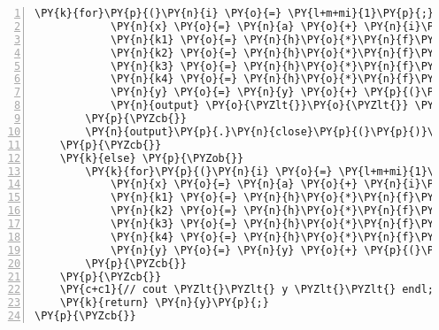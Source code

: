\begin{Verbatim}[tabsize=2,commandchars=\\\{\},numbers=left,firstnumber=1,stepnumber=1]
		\PY{k}{for}\PY{p}{(}\PY{n}{i} \PY{o}{=} \PY{l+m+mi}{1}\PY{p}{;} \PY{n}{i} \PY{o}{\PYZlt{}} \PY{n}{steps}\PY{o}{+}\PY{l+m+mi}{1}\PY{p}{;} \PY{n}{i}\PY{o}{+}\PY{o}{+}\PY{p}{)}\PY{p}{\PYZob{}}
			\PY{n}{x} \PY{o}{=} \PY{n}{a} \PY{o}{+} \PY{n}{i}\PY{o}{*}\PY{n}{h}\PY{p}{;}
			\PY{n}{k1} \PY{o}{=} \PY{n}{h}\PY{o}{*}\PY{n}{f}\PY{p}{(}\PY{n}{x}\PY{p}{,}\PY{n}{y}\PY{p}{)}\PY{p}{;}
			\PY{n}{k2} \PY{o}{=} \PY{n}{h}\PY{o}{*}\PY{n}{f}\PY{p}{(}\PY{n}{x} \PY{o}{+} \PY{l+m+mf}{0.5}\PY{o}{*}\PY{n}{h}\PY{p}{,} \PY{n}{y} \PY{o}{+} \PY{l+m+mf}{0.5}\PY{o}{*}\PY{n}{k1}\PY{p}{)}\PY{p}{;}
			\PY{n}{k3} \PY{o}{=} \PY{n}{h}\PY{o}{*}\PY{n}{f}\PY{p}{(}\PY{n}{x} \PY{o}{+} \PY{l+m+mf}{0.5}\PY{o}{*}\PY{n}{h}\PY{p}{,} \PY{n}{y} \PY{o}{+} \PY{l+m+mf}{0.5}\PY{o}{*}\PY{n}{k2}\PY{p}{)}\PY{p}{;}
			\PY{n}{k4} \PY{o}{=} \PY{n}{h}\PY{o}{*}\PY{n}{f}\PY{p}{(}\PY{n}{x} \PY{o}{+} \PY{n}{h}\PY{p}{,} \PY{n}{y} \PY{o}{+} \PY{n}{k3}\PY{p}{)}\PY{p}{;}
			\PY{n}{y} \PY{o}{=} \PY{n}{y} \PY{o}{+} \PY{p}{(}\PY{l+m+mf}{1.}\PY{o}{/}\PY{l+m+mf}{6.}\PY{p}{)}\PY{o}{*}\PY{p}{(}\PY{n}{k1} \PY{o}{+} \PY{l+m+mi}{2}\PY{o}{*}\PY{n}{k2} \PY{o}{+} \PY{l+m+mi}{2}\PY{o}{*}\PY{n}{k3} \PY{o}{+} \PY{n}{k4}\PY{p}{)}\PY{p}{;}
			\PY{n}{output} \PY{o}{\PYZlt{}}\PY{o}{\PYZlt{}} \PY{n}{x} \PY{o}{\PYZlt{}}\PY{o}{\PYZlt{}} \PY{l+s}{\PYZdq{}}\PY{l+s}{,}\PY{l+s}{\PYZdq{}} \PY{o}{\PYZlt{}}\PY{o}{\PYZlt{}} \PY{n}{y}\PY{p}{[}\PY{l+m+mi}{0}\PY{p}{]} \PY{o}{\PYZlt{}}\PY{o}{\PYZlt{}} \PY{n}{endl}\PY{p}{;}
		\PY{p}{\PYZcb{}}
		\PY{n}{output}\PY{p}{.}\PY{n}{close}\PY{p}{(}\PY{p}{)}\PY{p}{;}
	\PY{p}{\PYZcb{}}
	\PY{k}{else} \PY{p}{\PYZob{}}
		\PY{k}{for}\PY{p}{(}\PY{n}{i} \PY{o}{=} \PY{l+m+mi}{1}\PY{p}{;} \PY{n}{i} \PY{o}{\PYZlt{}} \PY{n}{steps}\PY{o}{+}\PY{l+m+mi}{1}\PY{p}{;} \PY{n}{i}\PY{o}{+}\PY{o}{+}\PY{p}{)}\PY{p}{\PYZob{}}
			\PY{n}{x} \PY{o}{=} \PY{n}{a} \PY{o}{+} \PY{n}{i}\PY{o}{*}\PY{n}{h}\PY{p}{;}
			\PY{n}{k1} \PY{o}{=} \PY{n}{h}\PY{o}{*}\PY{n}{f}\PY{p}{(}\PY{n}{x}\PY{p}{,}\PY{n}{y}\PY{p}{)}\PY{p}{;}
			\PY{n}{k2} \PY{o}{=} \PY{n}{h}\PY{o}{*}\PY{n}{f}\PY{p}{(}\PY{n}{x} \PY{o}{+} \PY{l+m+mf}{0.5}\PY{o}{*}\PY{n}{h}\PY{p}{,} \PY{n}{y} \PY{o}{+} \PY{l+m+mf}{0.5}\PY{o}{*}\PY{n}{k1}\PY{p}{)}\PY{p}{;}
			\PY{n}{k3} \PY{o}{=} \PY{n}{h}\PY{o}{*}\PY{n}{f}\PY{p}{(}\PY{n}{x} \PY{o}{+} \PY{l+m+mf}{0.5}\PY{o}{*}\PY{n}{h}\PY{p}{,} \PY{n}{y} \PY{o}{+} \PY{l+m+mf}{0.5}\PY{o}{*}\PY{n}{k2}\PY{p}{)}\PY{p}{;}
			\PY{n}{k4} \PY{o}{=} \PY{n}{h}\PY{o}{*}\PY{n}{f}\PY{p}{(}\PY{n}{x} \PY{o}{+} \PY{n}{h}\PY{p}{,} \PY{n}{y} \PY{o}{+} \PY{n}{k3}\PY{p}{)}\PY{p}{;}
			\PY{n}{y} \PY{o}{=} \PY{n}{y} \PY{o}{+} \PY{p}{(}\PY{l+m+mf}{1.}\PY{o}{/}\PY{l+m+mf}{6.}\PY{p}{)}\PY{o}{*}\PY{p}{(}\PY{n}{k1} \PY{o}{+} \PY{l+m+mi}{2}\PY{o}{*}\PY{n}{k2} \PY{o}{+} \PY{l+m+mi}{2}\PY{o}{*}\PY{n}{k3} \PY{o}{+} \PY{n}{k4}\PY{p}{)}\PY{p}{;}
		\PY{p}{\PYZcb{}}
	\PY{p}{\PYZcb{}}
	\PY{c+c1}{// cout \PYZlt{}\PYZlt{} y \PYZlt{}\PYZlt{} endl; // option print statement}
	\PY{k}{return} \PY{n}{y}\PY{p}{;}
\PY{p}{\PYZcb{}}
\end{Verbatim}
